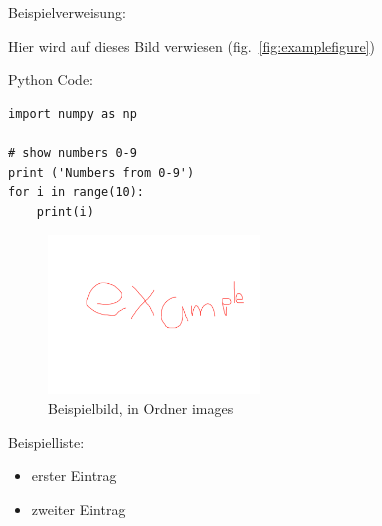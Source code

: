 \documentclass[11pt]{article}
\begin{document}
Beispielverweisung:

Hier wird auf dieses Bild verwiesen (fig.~\vref{fig:examplefigure})

Python Code:
\begin{lstlisting}[caption=Python code example]
import numpy as np

# show numbers 0-9
print ('Numbers from 0-9')
for i in range(10):
	print(i)
\end{lstlisting}


\begin{figure}[h!]
	\includegraphics[width=0.5\textwidth]{example.png}
	\caption{Beispielbild, in Ordner images}
	\label{fig:examplefigure}
\end{figure}

Beispielliste:

\begin{itemize}
	\item erster Eintrag
	\item zweiter Eintrag
\end{itemize}
\end{document}
